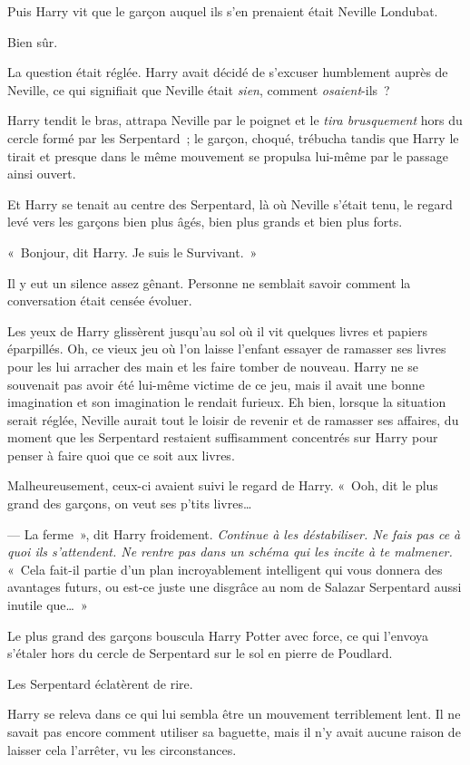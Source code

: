 Puis Harry vit que le garçon auquel ils s'en prenaient était Neville Londubat.

Bien sûr.

La question était réglée.
Harry avait décidé de s'excuser humblement auprès de Neville, ce qui signifiait que Neville était \emph{sien}, comment \emph{osaient}-ils~?

Harry tendit le bras, attrapa Neville par le poignet et le \emph{tira brusquement} hors du cercle formé par les Serpentard~; le garçon, choqué, trébucha tandis que Harry le tirait et presque dans le même mouvement se propulsa lui-même par le passage ainsi ouvert.

Et Harry se tenait au centre des Serpentard, là où Neville s'était tenu, le regard levé vers les garçons bien plus âgés, bien plus grands et bien plus forts.

«~Bonjour, dit Harry. Je suis le Survivant.~»

Il y eut un silence assez gênant.
Personne ne semblait savoir comment la conversation était censée évoluer.

Les yeux de Harry glissèrent jusqu'au sol où il vit quelques livres et papiers éparpillés.
Oh, ce vieux jeu où l'on laisse l'enfant essayer de ramasser ses livres pour les lui arracher des main et les faire tomber de nouveau.
Harry ne se souvenait pas avoir été lui-même victime de ce jeu, mais il avait une bonne imagination et son imagination le rendait furieux.
Eh bien, lorsque la situation serait réglée, Neville aurait tout le loisir de revenir et de ramasser ses affaires, du moment que les Serpentard restaient suffisamment concentrés sur Harry pour penser à faire quoi que ce soit aux livres.

Malheureusement, ceux-ci avaient suivi le regard de Harry.
«~Ooh, dit le plus grand des garçons, on veut ses p'tits livres…

--- La ferme~», dit Harry froidement.
\emph{Continue à les déstabiliser.
Ne fais pas ce à quoi ils s'attendent.
Ne rentre pas dans un schéma qui les incite à te malmener.}
«~Cela fait-il partie d'un plan incroyablement intelligent qui vous donnera des avantages futurs, ou est-ce juste une disgrâce au nom de Salazar Serpentard aussi inutile que…~»

Le plus grand des garçons bouscula Harry Potter avec force, ce qui l'envoya s'étaler hors du cercle de Serpentard sur le sol en pierre de Poudlard.

Les Serpentard éclatèrent de rire.

Harry se releva dans ce qui lui sembla être un mouvement terriblement lent.
Il ne savait pas encore comment utiliser sa baguette, mais il n'y avait aucune raison de laisser cela l'arrêter, vu les circonstances.

